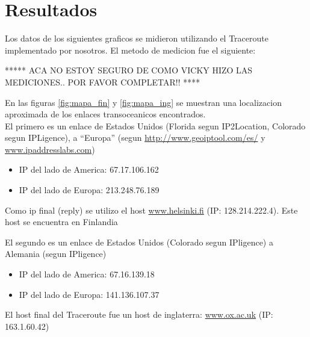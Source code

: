 \section{Resultados}


Los datos de los siguientes graficos se midieron utilizando el Traceroute implementado por nosotros. El metodo de medicion fue el siguiente:

***** ACA NO ESTOY SEGURO DE COMO VICKY HIZO LAS MEDICIONES.. POR FAVOR COMPLETAR!! ****

En las figuras \ref{fig:mapa_fin} y \ref{fig:mapa_ing} se muestran una localizacion aproximada de los enlaces transoceanicos encontrados.\\

El primero es un enlace de Estados Unidos (Florida segun IP2Location, Colorado segun IPLigence), a ``Europa'' (segun \url{http://www.geoiptool.com/es/} y \url{www.ipaddresslabs.com})\\

\begin{itemize}
 \item IP del lado de America: 67.17.106.162
 \item IP del lado de Europa: 213.248.76.189\\
\end{itemize}
    
Como ip final (reply) se utilizo el host \url{www.helsinki.fi} (IP: 128.214.222.4). Este host se encuentra en Finlandia


El segundo es un enlace de Estados Unidos (Colorado segun IPligence) a Alemania (segun IPligence)

\begin{itemize}
 \item IP del lado de America: 67.16.139.18
 \item IP del lado de Europa: 141.136.107.37\\
\end{itemize}

El host final del Traceroute fue un host de inglaterra: \url{www.ox.ac.uk} (IP: 163.1.60.42)


